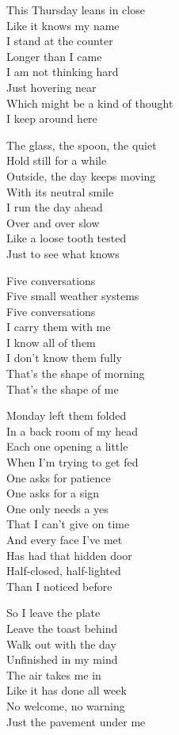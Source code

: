 \begin{lyrics}

This Thursday leans in close\\
Like it knows my name\\
I stand at the counter\\
Longer than I came\\
I am not thinking hard\\
Just hovering near\\
Which might be a kind of thought\\
I keep around here

The glass, the spoon, the quiet\\
Hold still for a while\\
Outside, the day keeps moving\\
With its neutral smile\\
I run the day ahead\\
Over and over slow\\
Like a loose tooth tested\\
Just to see what knows

Five conversations\\
Five small weather systems\\
Five conversations\\
I carry them with me\\
I know all of them\\
I don’t know them fully\\
That’s the shape of morning\\
That’s the shape of me

Monday left them folded\\
In a back room of my head\\
Each one opening a little\\
When I’m trying to get fed\\
One asks for patience\\
One asks for a sign\\
One only needs a yes\\
That I can’t give on time\\
And every face I’ve met\\
Has had that hidden door\\
Half-closed, half-lighted\\
Than I noticed before

So I leave the plate\\
Leave the toast behind\\
Walk out with the day\\
Unfinished in my mind\\
The air takes me in\\
Like it has done all week\\
No welcome, no warning\\
Just the pavement under me


\end{lyrics}
